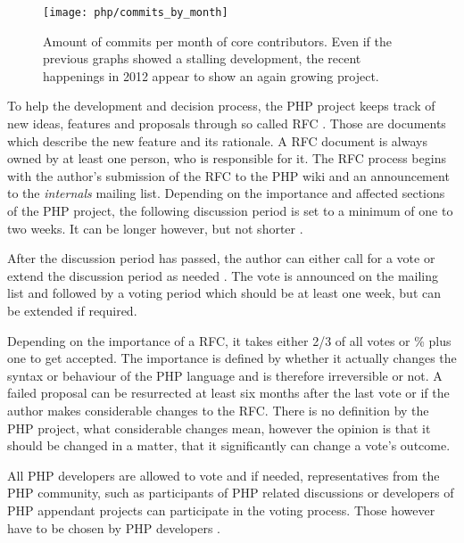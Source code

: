 \begin{figure}[htbp]
  \centering
  \texttt{[image: php/commits\_by\_month]}
  \caption[Commits by Month, PHP]
  {Amount of commits per month of core contributors. Even if the previous
    graphs showed a stalling development, the recent happenings in 2012 appear
    to show an again growing project.}
\end{figure}

To help the development and decision process, the PHP project keeps track of
new ideas, features and proposals through so called \ac{RFC} \cite{PHPRFC}.
Those are documents which describe the new feature and its rationale. A
\ac{RFC} document is always owned by at least one person, who is responsible
for it. The \ac{RFC} process begins with the author's submission of the
\ac{RFC} to the PHP wiki and an announcement to the \emph{internals} mailing
list. Depending on the importance and affected sections of the PHP project, the
following discussion period is set to a minimum of one to two weeks. It can be
longer however, but not shorter \cite{PHPVoting}.

After the discussion period has passed, the author can either call for a vote
or extend the discussion period as needed \cite{PHPVoting}. The vote is
announced on the mailing list and followed by a voting period which should be
at least one week, but can be extended if required.

Depending on the importance of a \ac{RFC}, it takes either 2/3 of all votes or
\unit[50]{\%} plus one to get accepted. The importance is defined by whether it
actually changes the syntax or behaviour of the PHP language and is therefore
irreversible or not. A failed proposal can be resurrected at least six months
after the last vote or if the author makes considerable changes to the
\ac{RFC}. There is no definition by the PHP project, what considerable changes
mean, however the opinion is that it should be changed in a matter, that it
significantly can change a vote's outcome.

All PHP developers are allowed to vote and if needed, representatives from
the PHP community, such as participants of PHP related discussions or
developers of PHP appendant projects can participate in the
voting process. Those however have to be chosen by PHP developers
\cite{PHPWhoVote}.

